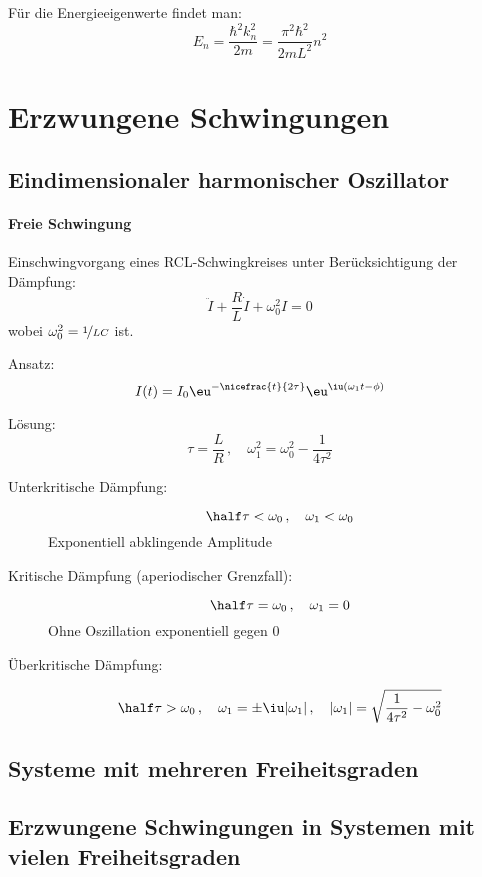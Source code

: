			Für die Energieeigenwerte findet man:
			\[
				E_n = \frac{\hbar^2 k_n^2}{2m} = \frac{\pi^2 \hbar^2}{2m L^2}n^2
			\]
\section{Erzwungene Schwingungen} %
	\subsection{Eindimensionaler harmonischer Oszillator} %
		\paragraph{Freie Schwingung} %
			Einschwingvorgang eines RCL-Schwingkreises unter Berücksichtigung der Dämpfung:
			\[
				\ddot I + \frac RL \dot I + \omega_0^2 I = 0
			\]
			wobei $\omega_0^2 = \nicefrac 1{LC}$ ist.
			
			Ansatz:
			\[
				I(t) = I_0 \eu^{-\nicefrac{t}{2\tau}} \eu^{\iu(\omega_1 t - \phi)}
			\]
			
			Lösung:
			\[
				\tau = \frac LR \,,\quad \omega_1^2 = \omega_0^2 - \frac{1}{4\tau^2}
			\]
			
			\begin{description}
				\item[Unterkritische Dämpfung:] \[
					\half\tau < \omega_0 \,, \quad \omega_1 < \omega_0
				\]
				Exponentiell abklingende Amplitude
				\item[Kritische Dämpfung (aperiodischer Grenzfall):] \[
					\half \tau = \omega_0 \,,\quad \omega_1 = 0
				\]
				Ohne Oszillation exponentiell gegen 0
				\item[Überkritische Dämpfung:] \[
					\half \tau > \omega_0 \,,\quad \omega_1 = \pm \iu |\omega_1| \,,\quad |\omega_1| = \sqrt{\frac{1}{4\tau^2} - \omega_0^2}
				\]
			\end{description}
	\subsection{Systeme mit mehreren Freiheitsgraden} %
		
	\subsection{Erzwungene Schwingungen in Systemen mit vielen Freiheitsgraden} %
